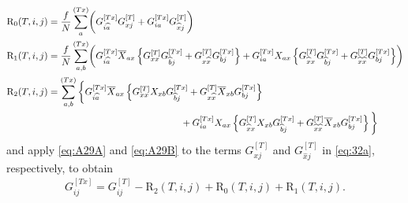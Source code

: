 \documentclass[11pt]{article}
\theoremstyle{plain}
\theoremstyle{remark}
\numberwithin{equation}{section}
\newcommand*\barr[1]{\overline{#1}}
\newcommand*\bset[1]{[#1]}
\newcommand*\ubarr[1]{{\widehat{#1}}}
\begin{document}
	\begin{align}
		\mathrm{R}_0(T,i,j) & = \frac{f}{N} \sum_{a}^{(Tx)}  \biggl( G_{i \ubarr{a}}^{\bset{Tx}} G^{\bset{T}}_{xj} + G_{ia}^{\bset{Tx}} G_{\ubarr{x}j}^{\bset{T}} \biggr) \label{eq:defireste}\\
		\mathrm{R}_1(T,i,j)& = \frac{f}{N} \sum_{a,b}^{(Tx)} \biggl(G_{i\ubarr{a}}^{\bset{Tx}} \barr{X}_{ax} \left\{ G_{xx}^{\bset{T}}G_{\ubarr{b}j}^{\bset{Tx}} + G_{x\ubarr{x}}^{\bset{T}} G_{bj}^{\bset{Tx}} \right\} + G_{ia}^{\bset{Tx}} X_{ax} \left\{ G_{\ubarr{x}x}^{\bset{T}} G_{\ubarr{b}j}^{\bset{Tx}} + G_{\ubarr{x}\ubarr{x}}^{\bset{T}}  G_{bj}^{\bset{Tx}} \right\}\biggr) 
		\label{eq:def_R_1}\\ 
		\mathrm{R}_2(T,i,j) & = \sum_{a,b}^{(Tx)} \bigg\{G_{i\ubarr{a}}^{\bset{Tx}} \barr{X}_{ax} \left\{ G_{xx}^{\bset{T}} X_{xb} G_{\ubarr{b}j}^{\bset{Tx}} + G_{x\ubarr{x}}^{\bset{T}} \barr{X}_{xb}G_{bj}^{\bset{Tx}} \right\} 
		\notag \\ 
		& \qquad \qquad \qquad \qquad \qquad \qquad \qquad  +  G_{ia}^{\bset{Tx}} X_{ax} \left\{ G_{\ubarr{x}x}^{\bset{T}} X_{xb} G_{\ubarr{b}j}^{\bset{Tx}} + G_{\ubarr{x}\ubarr{x}}^{\bset{T}} \barr{X}_{xb} G_{bj}^{\bset{Tx}} \right\} \bigg\}\label{eq:def_R_2} 
	\end{align}
	and apply \cref{eq:A29A} and \cref{eq:A29B} to the terms $G_{xj}^{\bset{T}}$ and $G_{\ubarr{x}j}^{\bset{T}}$ in \cref{eq:32a}, respectively, to obtain 
	\begin{align}
		G_{ij}^{\bset{Tx}} = G_{ij}^{\bset{T}} - \mathrm{R}_2(T,i,j)
		+ \mathrm{R}_0(T,i,j)+ \mathrm{R}_1(T,i,j). \label{eq:A32b}
	\end{align}


	
	
	
	
	
\end{document}
